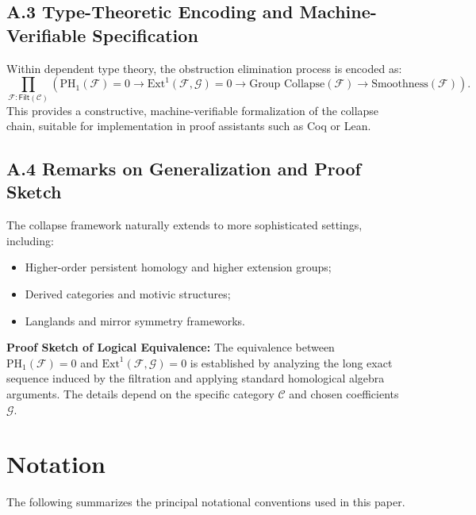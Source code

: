 \documentclass[11pt]{article}
\begin{document}
\subsection*{A.3 Type-Theoretic Encoding and Machine-Verifiable Specification}

Within dependent type theory, the obstruction elimination process is encoded as:
\begin{equation}
\prod_{\mathcal{F} : \mathsf{Filt}(\mathcal{C})} 
\left( \mathrm{PH}_1(\mathcal{F}) = 0 \rightarrow \mathrm{Ext}^1(\mathcal{F}, \mathcal{G}) = 0 
\rightarrow \text{Group Collapse}(\mathcal{F}) 
\rightarrow \text{Smoothness}(\mathcal{F})
\right).
\end{equation}
This provides a constructive, machine-verifiable formalization of the collapse chain, suitable for implementation in proof assistants such as Coq or Lean.

\subsection*{A.4 Remarks on Generalization and Proof Sketch}

The collapse framework naturally extends to more sophisticated settings, including:

\begin{itemize}
    \item Higher-order persistent homology and higher extension groups;
    \item Derived categories and motivic structures;
    \item Langlands and mirror symmetry frameworks.
\end{itemize}

\textbf{Proof Sketch of Logical Equivalence:}  
The equivalence between $\mathrm{PH}_1(\mathcal{F}) = 0$ and $\mathrm{Ext}^1(\mathcal{F}, \mathcal{G}) = 0$ is established by analyzing the long exact sequence induced by the filtration and applying standard homological algebra arguments. The details depend on the specific category $\mathcal{C}$ and chosen coefficients $\mathcal{G}$.


\section*{Notation}

The following summarizes the principal notational conventions used in this paper.
\end{document}
